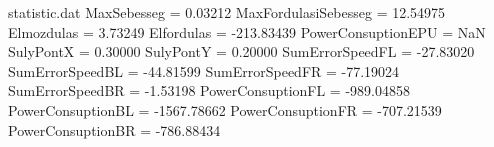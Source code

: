 \begin{filecontents*}{statistic.dat}
MaxSebesseg =    0.03212
MaxFordulasiSebesseg =   12.54975
Elmozdulas =    3.73249
Elfordulas = -213.83439
PowerConsuptionEPU =        NaN
SulyPontX =    0.30000
SulyPontY =    0.20000
SumErrorSpeedFL =  -27.83020
SumErrorSpeedBL =  -44.81599
SumErrorSpeedFR =  -77.19024
SumErrorSpeedBR =   -1.53198
PowerConsuptionFL = -989.04858
PowerConsuptionBL = -1567.78662
PowerConsuptionFR = -707.21539
PowerConsuptionBR = -786.88434
\end{filecontents*}
